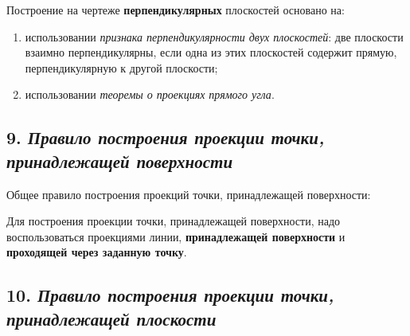 \begin{mainQuote}
    
\end{mainQuote}

Построение на чертеже {\bf перпендикулярных} плоскостей основано на:
\begin{enumerate}
    \item использовании \textit {признака перпендикулярности двух плоскостей}: две плоскости взаимно перпендикулярны, если одна из этих плоскостей содержит прямую, перпендикулярную к другой плоскости;
    \item использовании \textit {теоремы о проекциях прямого угла}.
\end{enumerate}




\newpage
\subsection*{9. \textit{Правило построения проекции точки, принадлежащей поверхности}}

\begin{mainQuote}
\end{mainQuote}

Общее правило построения проекций точки, принадлежащей поверхности:

Для построения проекции точки, принадлежащей поверхности, надо воспользоваться проекциями линии, {\bf принадлежащей поверхности} и {\bf проходящей через заданную точку}. 


\newpage
\subsection*{10. \textit{Правило построения проекции точки, принадлежащей плоскости}}

\begin{mainQuote}
    
\end{mainQuote}


